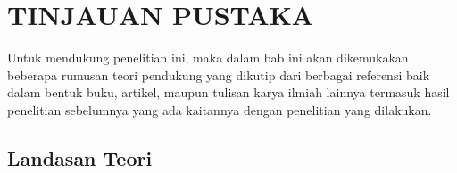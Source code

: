 \chapter{TINJAUAN PUSTAKA}
\thispagestyle{plain} %
\par Untuk mendukung penelitian ini, maka dalam bab ini akan dikemukakan beberapa rumusan teori pendukung yang dikutip dari berbagai referensi baik dalam bentuk buku, artikel, maupun tulisan karya ilmiah lainnya termasuk hasil penelitian sebelumnya yang ada kaitannya dengan penelitian yang dilakukan.
\section{Landasan Teori}



